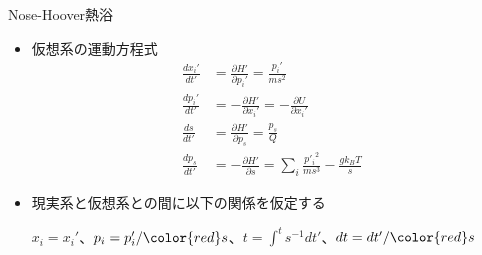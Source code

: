 
\begin{frame}[t,fragile]{Nose-Hoover熱浴}
  \begin{itemize}
  \item 仮想系の運動方程式
    \begin{align*}
      \frac{dx_i'}{dt'} &= \frac{\partial H'}{\partial p_i'} = \frac{p_i'}{ms^2} \\
      \frac{dp_i'}{dt'} &= -\frac{\partial H'}{\partial x_i'} = -\frac{\partial U}{\partial x_i'} \\
      \frac{ds}{dt'} &= \frac{\partial H'}{\partial p_s} = \frac{p_s}{Q} \\
      \frac{dp_s}{dt'} &= -\frac{\partial H'}{\partial s} = \sum_i \frac{{p'_i}^2}{ms^3} - \frac{g k_B T}{s}
    \end{align*}
  \item 現実系と仮想系との間に以下の関係を仮定する

    $x_i=x_i'$、$p_i=p_i'/{\color{red}s}$、$t=\int^t s^{-1} dt'$、$dt=dt'/{\color{red}s}$
  \end{itemize}
\end{frame}
